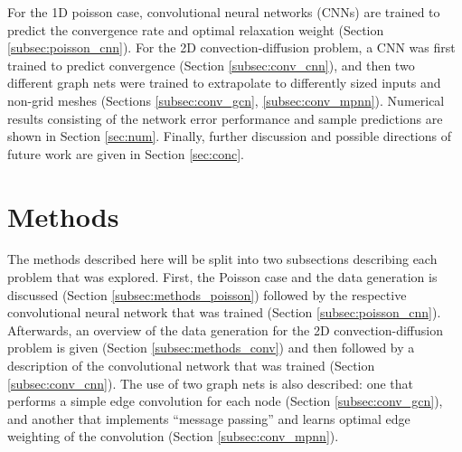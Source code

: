 \documentclass[review]{siamart190516}
\begin{document}
For the 1D poisson case, convolutional neural networks (CNNs) are trained to predict the convergence rate and optimal relaxation weight (Section \ref{subsec:poisson_cnn}).  For the 2D convection-diffusion problem, a CNN was first trained to predict convergence (Section \ref{subsec:conv_cnn}), and then two different graph nets were trained to extrapolate to differently sized inputs and non-grid meshes (Sections \ref{subsec:conv_gcn}, \ref{subsec:conv_mpnn}).  Numerical results consisting of the network error performance and sample predictions are shown in Section \ref{sec:num}.  Finally, further discussion and possible directions of future work are given in Section \ref{sec:conc}.



\section{Methods}\label{sec:methods}

The methods described here will be split into two subsections describing each problem that was explored. First, the Poisson case and the data generation is discussed (Section \ref{subsec:methods_poisson}) followed by the respective convolutional neural network that was trained (Section \ref{subsec:poisson_cnn}).  Afterwards, an overview of the data generation for the 2D convection-diffusion problem is given (Section \ref{subsec:methods_conv}) and then followed by a description of the convolutional network that was trained (Section \ref{subsec:conv_cnn}).  The use of two graph nets is also described: one that performs a simple edge convolution for each node (Section \ref{subsec:conv_gcn}), and another that implements ``message passing'' and learns optimal edge weighting of the convolution (Section \ref{subsec:conv_mpnn}).
\end{document}
